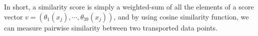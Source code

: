 In short, a similarity score is simply a weighted-sum of all the elements of a score vector $v = (\theta_1(x_j), \cdots, \theta_{39}(x_j))$, 
and by using cosine similarity function, we can measure pairwise similarity between two transported data points. 
%

